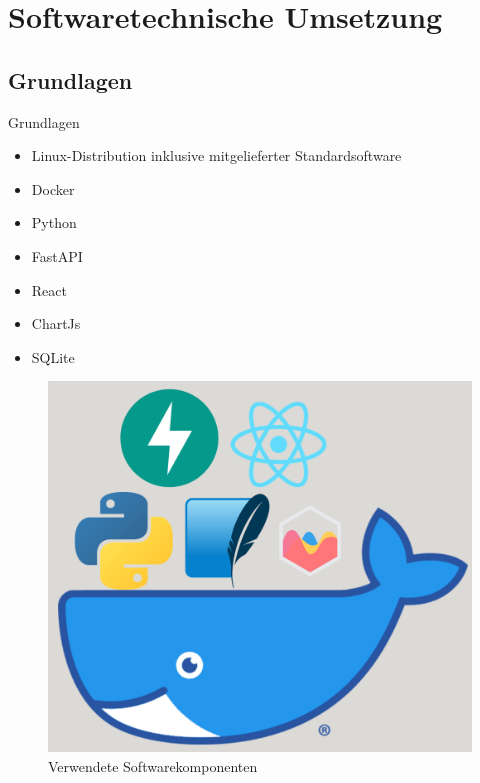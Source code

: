 \documentclass[10pt,ngerman]{beamer}
\begin{document}
\section{Softwaretechnische Umsetzung}

\subsection{Grundlagen}
\begin{frame}[fragile]{Grundlagen}
  \begin{minipage}[t]{0.49\textwidth}
    \begin{itemize}
      \item Linux-Distribution inklusive mitgelieferter Standardsoftware
      \item Docker
      \item Python
      \item FastAPI
      \item React
      \item ChartJs
      \item SQLite
    \end{itemize}
  \end{minipage}
  \begin{minipage}[t]{0.49\textwidth}
    \begin{figure}
      \centering
      \captionsetup{justification=centering}
      \includegraphics[width=1\textwidth]{pictures/SoftwareKomponenten.png}
      \caption{Verwendete Softwarekomponenten \autocite{dockerLogo}\autocite{fastapiLogo}\autocite{sqliteLogo}\autocite{reactLogo}\autocite{pythonLogo}\autocite{chartjsLogo}}
    \end{figure}
  \end{minipage}
\end{frame}
\end{document}
